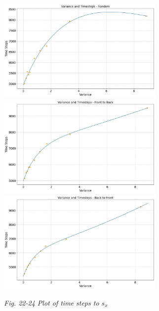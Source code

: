 \documentclass{article}
\theoremstyle{definition}
\theoremstyle{remark}
\numberwithin{equation}{section}
\begin{document}
	\begin{center}
		\includegraphics[height = 5cm]{variance and timesteps random fitted.jpg}
		\includegraphics[height = 5cm]{variance and timesteps ftb fitted.jpg}
		\includegraphics[height = 5cm]{avetimesteps btf.jpg}

		\small\textit{Fig. 22-24 Plot of time steps to \(s_x\)}
	\end{center}
\end{document}
